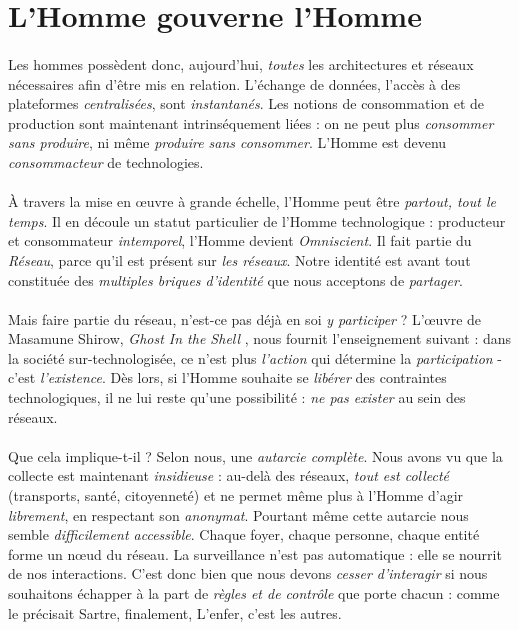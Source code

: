 \section{L'Homme gouverne l'Homme}

\paragraph{} Les hommes possèdent donc, aujourd'hui, \emph{toutes} les architectures et réseaux
nécessaires afin d'être mis en relation. L'échange de données, l'accès à des plateformes
\emph{centralisées}, sont \emph{instantanés}. Les notions de consommation et de production
sont maintenant intrinséquement liées : on ne peut plus \emph{consommer sans produire}, ni même
\emph{produire sans consommer}. L'Homme est devenu \emph{consommacteur} de technologies.

\paragraph{} À travers la mise en \oe{}uvre à grande échelle, l'Homme peut être
\emph{partout, tout le temps}. Il en découle un statut particulier de l'Homme 
technologique : producteur et consommateur \emph{intemporel}, l'Homme devient \emph{Omniscient}.
Il fait partie du \emph{Réseau}, parce qu'il est présent sur \emph{les réseaux}. Notre identité
est avant tout constituée des \emph{multiples briques d'identité} que nous acceptons de
\emph{partager}.

\paragraph{} Mais faire partie du réseau, n'est-ce pas déjà en soi \emph{y participer} ? L'\oe{}uvre
de Masamune Shirow, \emph{Ghost In the Shell} \cite{GhostInTheShell}, nous fournit l'enseignement
suivant : dans la société sur-technologisée, ce n'est plus \emph{l'action} qui détermine la
\emph{participation} - c'est \emph{l'existence}. Dès lors, si l'Homme souhaite se \emph{libérer}
des contraintes technologiques, il ne lui reste qu'une possibilité : \emph{ne pas exister} au
sein des réseaux.

\paragraph{} Que cela implique-t-il ? Selon nous, une \emph{autarcie complète}. Nous avons vu que la
collecte est maintenant \emph{insidieuse} : au-delà des réseaux, \emph{tout est collecté} (transports,
santé, citoyenneté) et ne permet même plus à l'Homme d'agir \emph{librement}, en respectant son
\emph{anonymat}. Pourtant même cette autarcie nous semble \emph{difficilement accessible}. Chaque foyer,
chaque personne, chaque entité forme un n\oe{}ud du réseau. La surveillance n'est pas automatique : 
elle se nourrit de nos interactions. C'est donc bien que nous devons \emph{cesser d'interagir} si nous
souhaitons échapper à la part de \emph{règles et de contrôle} que porte chacun : comme le précisait Sartre,
finalement, \guillemotleft L'enfer, c'est les autres\guillemotright \cite{Sartre0}.


